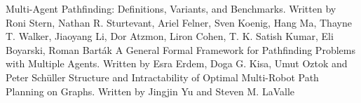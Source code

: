 \documentclass{llncs}
\begin{document}


    





\newpage
\begin{thebibliography}{2}
Multi-Agent Pathfinding: Definitions, Variants, and Benchmarks. Written by Roni Stern, Nathan R. Sturtevant, Ariel Felner, Sven Koenig, Hang Ma, Thayne T. Walker, Jiaoyang Li, Dor Atzmon, Liron Cohen, T. K. Satish Kumar, Eli Boyarski, Roman Barták
A General Formal Framework for Pathfinding Problems with Multiple Agents. Written by Esra Erdem, Doga G. Kisa, Umut Oztok and Peter Schüller
Structure and Intractability of Optimal Multi-Robot Path Planning on Graphs. Written by Jingjin Yu and Steven M. LaValle

\end{thebibliography}
\end{document}
